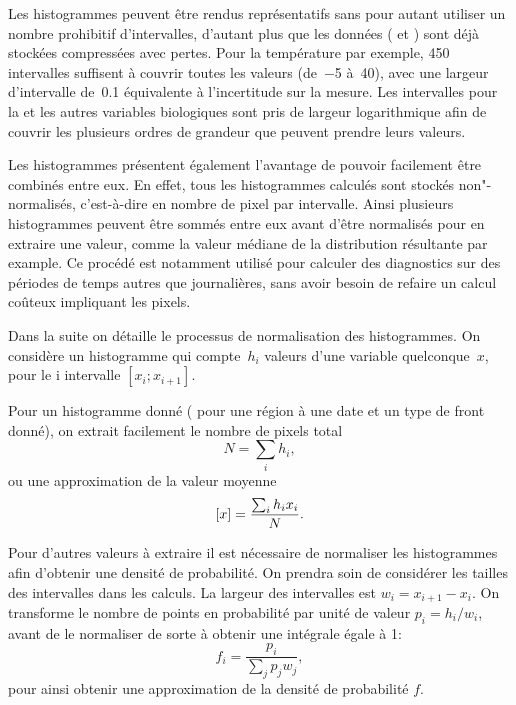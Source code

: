 Les histogrammes peuvent être rendus représentatifs sans pour autant utiliser un nombre prohibitif d'intervalles, d'autant plus que les données ( et ) sont déjà stockées compressées avec pertes. Pour la température par exemple, 450 intervalles suffisent à couvrir toutes les valeurs (de~\qty{-5}{\dC} à~\qty{40}{\dC}), avec une largeur d'intervalle de~\qty{0.1}{\dC} équivalente à l'incertitude sur la mesure.
Les intervalles pour la  et les autres variables biologiques sont pris de largeur logarithmique afin de couvrir les plusieurs ordres de grandeur que peuvent prendre leurs valeurs.

Les histogrammes présentent également l'avantage de pouvoir facilement être combinés entre eux.
En effet, tous les histogrammes calculés sont stockés non"-normalisés, c'est-à-dire en nombre de pixel par intervalle. Ainsi plusieurs histogrammes peuvent être sommés entre eux avant d'être normalisés pour en extraire une valeur, comme la valeur médiane de la distribution résultante par example.
Ce procédé est notamment utilisé pour calculer des diagnostics sur des périodes de temps autres que journalières, sans avoir besoin de refaire un calcul coûteux impliquant les pixels.

Dans la suite on détaille le processus de normalisation des histogrammes.
On considère un histogramme qui compte~\(h_i\) valeurs d'une variable quelconque~\(x\), pour le i\ieme{} intervalle \(\left[x_i; x_{i+1} \right]\).

Pour un histogramme donné ( pour une région à une date et un type de front donné), on extrait facilement le nombre de pixels total
\begin{equation}
  N = \sum_i h_i,
\end{equation}
ou une approximation de la valeur moyenne
\begin{equation}
  \left[x\right] = \frac{\sum_i h_i x_i} {N}.
\end{equation} %

Pour d'autres valeurs à extraire il est nécessaire de normaliser les histogrammes afin d'obtenir une densité de probabilité. On prendra soin de considérer les tailles des intervalles dans les calculs.
La largeur des intervalles est \(w_i = x_{i+1}-x_i\). On transforme le nombre de points en probabilité par unité de valeur \(p_i = h_i / w_i \), avant de le normaliser de sorte à obtenir une intégrale égale à 1:
\begin{equation}
  f_i = \frac{p_i} {\sum_j p_j w_j},
\end{equation}
pour ainsi obtenir une approximation de la densité de probabilité \(f\).

